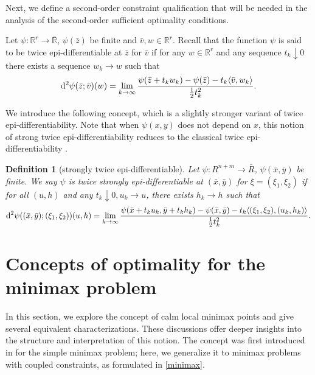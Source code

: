 \documentclass[11pt]{article}
\numberwithin{equation}{section}
\newtheorem{definition}{Definition}[section]
\begin{document}
{Next, we define a second-order constraint qualification that will be needed in the analysis of the second-order sufficient optimality conditions.


Let $\psi: \mathbb{R}^r \rightarrow \overline{\mathbb{R}}$, $\psi(\bar z)$ be finite and $\bar v, w\in  \mathbb{R}^r$. Recall that the function $\psi$ is said to be twice epi-differentiable at $\bar z$ for $\bar v$ if for any $w \in \mathbb{R}^r$ and any sequence $t_k\downarrow 0$ there exists a sequence $w_k\rightarrow w$ such that
\begin{equation*}
	{\rm d}^2\psi(\bar z;\bar v)(w) = \lim_{k\rightarrow \infty}  \frac{\psi(\bar{z}+t_kw_k)-\psi(\bar{z})-t_k\langle \bar{v}, w_k\rangle}{\frac{1}{2}t_k^2}.
\end{equation*}

We introduce the following concept, which is a slightly stronger variant of twice epi-differentiability. Note that when $\psi(x,y)$ does not depend on $x$, this notion of strong twice epi-differentiability reduces to the classical twice epi-differentiability \cite[Defintion13.6]{RoWe98}.

\begin{definition}[strongly twice epi-differentiable]\label{strongepi}  Let $\psi: {R}^{n+m} \rightarrow \bar{{R}}$, $\psi(\bar x,\bar y)$ be finite. We say 
$\psi$ is twice strongly epi-differentiable at $(\bar x,\bar y)$ for   $\xi=(\xi_1,\xi_2)$ if for all $(u,h)$ and  any $t_k\downarrow 0, u_k \rightarrow u$, there  exists {$h_k \rightarrow h$} such that 
 $${\rm d}^2\psi((\bar x,\bar y); (\xi_1,\xi_2))(u,h)=\lim_{k \rightarrow \infty } \frac{\psi(\bar{x}+t_ku_k, \bar y+t_k h_k)-\psi(\bar{x},\bar y)-t_k \langle (\xi_1,\xi_2),(u_k,h_k)\rangle }{\frac{1}{2}t_k^2}. $$
 \end{definition}





\section{Concepts of optimality for the minimax problem}\label{section-points}

In this section, we explore the concept of calm local minimax points and give several equivalent characterizations. These discussions offer deeper insights into the structure and interpretation of this notion. The concept was first introduced in \cite{Ma2023} for the simple minimax problem; here, we generalize it to minimax problems with coupled constraints, as formulated in \eqref{minimax}.

}
\end{document}
